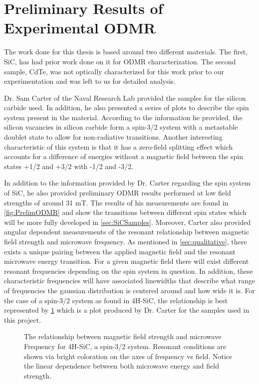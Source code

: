 \documentclass[oneside, astronomy, noacknowlegments]{BYUPhys}
\begin{document}
\section{Preliminary Results of Experimental ODMR}

The work done for this thesis is based around two different materials. The first, SiC, has had prior work done on it for ODMR characterization. The second sample, CdTe, was not optically characterized for this work prior to our experimentation and was left to us for detailed analysis.

Dr. Sam Carter of the Naval Research Lab provided the samples for the silicon carbide used. In addition, he also presented a series of plots to describe the spin system present in the material. According to the information he provided, the silicon vacancies in silicon carbide form a spin-3/2 system with a metastable doublet state to allow for non-radiative transitions. Another interesting characteristic of this system is that it has a zero-field splitting effect which accounts for a difference of energies without a magnetic field between the spin states +1/2 and +3/2 with -1/2 and -3/2.

In addition to the information provided by Dr. Carter regarding the spin system of SiC, he also provided preliminary ODMR results performed at low field strengths of around 31 mT. The results of his measurements are found in \ref{fig:PrelimODMR} and show the transitions between different spin states which will be more fully developed in \ref{sec:SiCSamples}. Moreover, Carter also provided angular dependent measurements of the resonant relationship between magnetic field strength and microwave frequency. As mentioned in \ref{sec:qualitative}, there exists a unique pairing between the applied magnetic field and the resonant microwave energy transition. For a given magnetic field there will exist different resonant frequencies depending on the spin system in question. In addition, these characteristic frequencies will have associated linewidths that describe what range of frequencies the gaussian distribution is centered around and how wide it is. For the case of a spin-3/2 system as found in 4H-SiC, the relationship is best represented by \ref{fig:MFRelationship} which is a plot produced by Dr. Carter for the samples used in this project.

\begin{figure}
    \caption[Magnetic field and microwave frequency relationship]{\label{fig:MFRelationship}
     The relationship between magnetic field strength and microwave Frequency for 4H-SiC, a spin-3/2 system. Resonant conditions are shown via bright coloration on the axes of frequency vs field. Notice the linear dependence between both microwave energy and field strength.}
 \end{figure}
 
\end{document}
